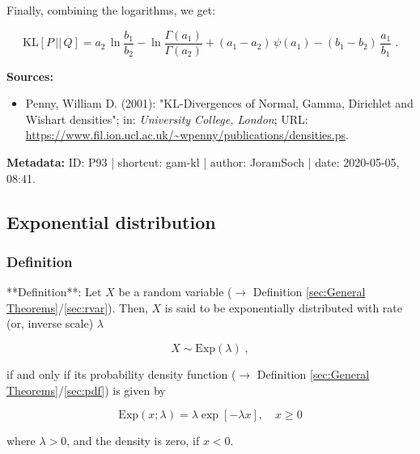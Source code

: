 \documentclass[a4paper,12pt,twoside]{book}
\begin{document}
Finally, combining the logarithms, we get:

\begin{equation} \label{eq:gam-kl-gam-KL-qed}
\mathrm{KL}[P\,||\,Q] = a_2 \, \ln \frac{b_1}{b_2} - \ln \frac{\Gamma(a_1)}{\Gamma(a_2)} + (a_1 - a_2) \, \psi(a_1) - (b_1 - b_2) \, \frac{a_1}{b_1} \; .
\end{equation}


\vspace{1em}
\textbf{Sources:}
\begin{itemize}
\item Penny, William D. (2001): "KL-Divergences of Normal, Gamma, Dirichlet and Wishart densities"; in: \textit{University College, London}; URL: \url{https://www.fil.ion.ucl.ac.uk/~wpenny/publications/densities.ps}.
\end{itemize}


\vspace{1em}
\textbf{Metadata:} ID: P93 | shortcut: gam-kl | author: JoramSoch | date: 2020-05-05, 08:41.
\vspace{1em}



\subsection{Exponential distribution}

\subsubsection[\textit{Definition}]{Definition} \label{sec:exp}
\setcounter{equation}{0}

**Definition**: Let $X$ be a random variable ($\rightarrow$ Definition \ref{sec:General Theorems}/\ref{sec:rvar}). Then, $X$ is said to be exponentially distributed with rate (or, inverse scale) $\lambda$

\begin{equation} \label{eq:exp-exp}
X \sim \mathrm{Exp}(\lambda) \; ,
\end{equation}

if and only if its probability density function ($\rightarrow$ Definition \ref{sec:General Theorems}/\ref{sec:pdf}) is given by

\begin{equation} \label{eq:exp-exp-pdf}
\mathrm{Exp}(x; \lambda) = \lambda \exp[-\lambda x], \quad x \geq 0
\end{equation}

where $\lambda > 0$, and the density is zero, if $x < 0$.
\end{document}
